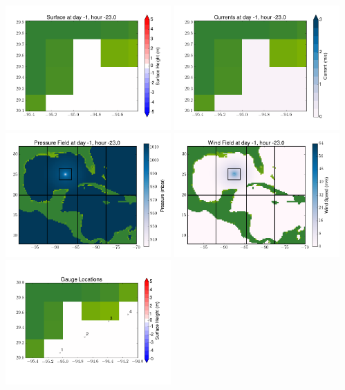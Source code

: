 \documentclass[11pt]{article}
\begin{document}
\includegraphics[width=0.475\textwidth]{frame0025fig6.png}
\vskip 10pt 
\includegraphics[width=0.475\textwidth]{frame0025fig7.png}
\includegraphics[width=0.475\textwidth]{frame0025fig8.png}
\vskip 10pt 
\includegraphics[width=0.475\textwidth]{frame0025fig9.png}
\includegraphics[width=0.475\textwidth]{frame0025fig10.png}
\end{document}
